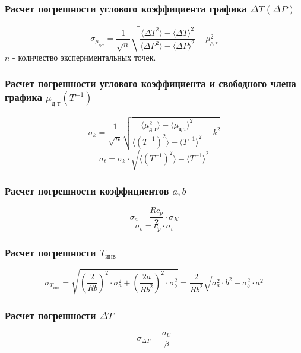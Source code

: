 \subsubsection{Расчет погрешности углового коэффициента графика $\Delta T(\Delta P)$}
\[\sigma_{\mu_\text{д-т}} = \frac{1}{\sqrt{n}}\sqrt{\frac{\langle \Delta T^2 \rangle - {\langle \Delta T \rangle}^2}{\langle \Delta P^2 \rangle - {\langle \Delta P \rangle}^2} - \mu_\text{д-т}^2}\] $n$ - количество экспериментальных точек.
\subsubsection{Расчет погрешности углового коэффициента и свободного члена графика $\mu_\text{д-т}(T^{-1})$}
\[\sigma_{k} = \frac{1}{\sqrt{n}}\sqrt{\frac{\langle \mu_\text{д-т}^2 \rangle - {\langle \mu_\text{д-т} \rangle}^2}{\langle (T^{-1})^2 \rangle - {\langle T^{-1} \rangle}^2} - k^2}\]
\[\sigma_t = \sigma_{k} \cdot \sqrt{\langle (T^{-1})^2 \rangle - {\langle T^{-1} \rangle}^2}\]
\subsubsection{Расчет погрешности коэффициентов $a, b$}
\[\sigma_a = \frac{Rc_p}{2}\cdot \sigma_K\]
\[\sigma_b = c_p \cdot \sigma_t\]
\subsubsection{Расчет погрешности $T_\text{инв}$}
\[ \sigma_{T_{инв}} = \sqrt{(\frac{2}{Rb})^2\cdot \sigma_a^2 + (\frac{2a}{Rb^2})^2\cdot \sigma_b^2} = \frac{2}{Rb^2}\sqrt{\sigma_a^2\cdot b^2 + \sigma_b^2\cdot a^2}\]
\subsubsection{Расчет погрешности $\Delta T$}
\[\sigma_{\Delta T} = \frac{\sigma_U}{\beta}\]